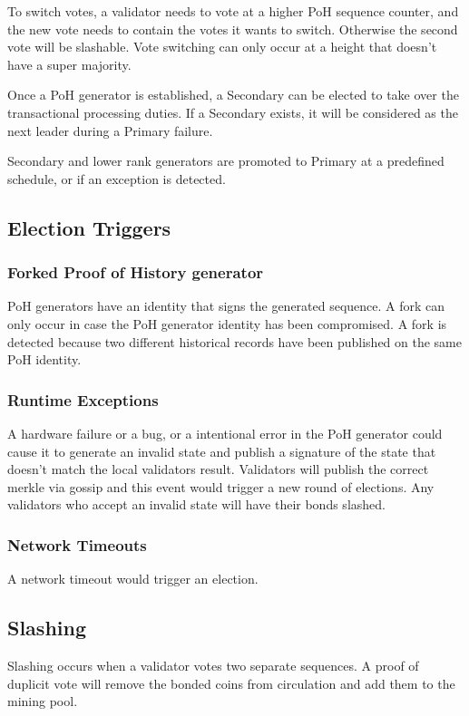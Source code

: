 \documentclass[12pt]{article}
\begin{document}
To switch votes, a validator needs to vote at a higher PoH sequence counter, and the new vote needs to contain the votes it wants to switch. Otherwise the second vote will be slashable. Vote switching can only occur at a height that doesn’t have a super majority.

Once a PoH generator is established, a Secondary can be elected to take over the transactional processing duties. If a Secondary exists, it will be considered as the next leader during a Primary failure.

Secondary and lower rank generators are promoted to Primary at a predefined schedule, or if an exception is detected.
\subsection{Election Triggers}
\subsubsection{Forked Proof of History generator}

PoH generators have an identity that signs the generated sequence. A fork can only occur in case the PoH generator identity has been compromised. A fork is detected because two different historical records have been published on the same PoH identity.

\subsubsection{Runtime Exceptions}
A hardware failure or a bug, or a intentional error in the PoH generator could cause it to generate an invalid state and publish a signature of the state that doesn’t match the local validators result. Validators will publish the correct merkle via gossip and this event would trigger a new round of elections. Any validators who accept an invalid state will have their bonds slashed.

\subsubsection{Network Timeouts}

A network timeout would trigger an election.

\subsection{Slashing}
Slashing occurs when a validator votes two separate sequences. A proof of duplicit vote will remove the bonded coins from circulation and add them to the mining pool.
\end{document}

